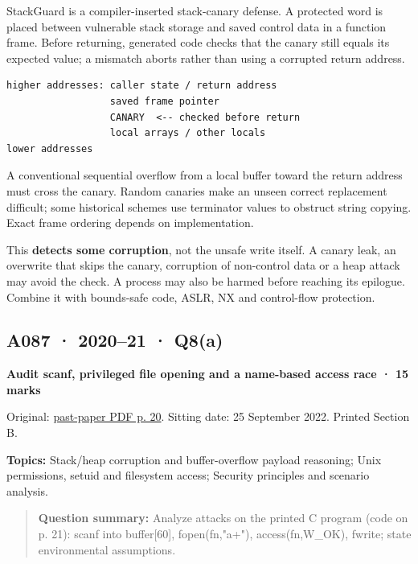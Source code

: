 \documentclass[11pt,a4paper]{article}
\begin{document}
StackGuard is a compiler-inserted stack-canary defense. A protected word is placed between vulnerable stack storage and saved control data in a function frame. Before returning,\allowbreak{} generated code checks that the canary still equals its expected value; a mismatch aborts rather than using a corrupted return address.



\begin{Verbatim}[breaklines=true,breakanywhere=true,fontsize=\small,frame=single,rulecolor=\color{PanelBorder}]
higher addresses: caller state / return address
                  saved frame pointer
                  CANARY  <-- checked before return
                  local arrays / other locals
lower addresses
\end{Verbatim}

A conventional sequential overflow from a local buffer toward the return address must cross the canary. Random canaries make an unseen correct replacement difficult; some historical schemes use terminator values to obstruct string copying. Exact frame ordering depends on implementation.


This \textbf{detects some corruption},\allowbreak{} not the unsafe write itself. A canary leak,\allowbreak{} an overwrite that skips the canary,\allowbreak{} corruption of non-control data or a heap attack may avoid the check. A process may also be harmed before reaching its epilogue. Combine it with bounds-safe code,\allowbreak{} ASLR,\allowbreak{} NX and control-flow protection.




\clearpage
\subsection{A087 · 2020–21 · Q8(a)}\label{a087}

\textbf{Audit scanf,\allowbreak{} privileged file opening and a name-based access race · 15 marks}


Original: \href{../../CSE405-Security_Merged.pdf\#page=20}{past-paper PDF p. 20}. Sitting date: 25 September 2022. Printed Section B.


\textbf{Topics:} Stack/\allowbreak{}heap corruption and buffer-overflow payload reasoning; Unix permissions,\allowbreak{} setuid and filesystem access; Security principles and scenario analysis.



\begin{quote}\small

\textbf{Question summary:} Analyze attacks on the printed C program (code on p. 21): scanf into buffer[60],\allowbreak{} fopen(fn,\allowbreak{}"a+"),\allowbreak{} access(fn,\allowbreak{}W\_OK),\allowbreak{} fwrite; state environmental assumptions.



\end{quote}
\end{document}

